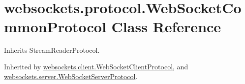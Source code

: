 \hypertarget{classwebsockets_1_1protocol_1_1_web_socket_common_protocol}{}\section{websockets.\+protocol.\+Web\+Socket\+Common\+Protocol Class Reference}
\label{classwebsockets_1_1protocol_1_1_web_socket_common_protocol}


Inherits Stream\+Reader\+Protocol.



Inherited by \hyperlink{classwebsockets_1_1client_1_1_web_socket_client_protocol}{websockets.\+client.\+Web\+Socket\+Client\+Protocol}, and \hyperlink{classwebsockets_1_1server_1_1_web_socket_server_protocol}{websockets.\+server.\+Web\+Socket\+Server\+Protocol}.

